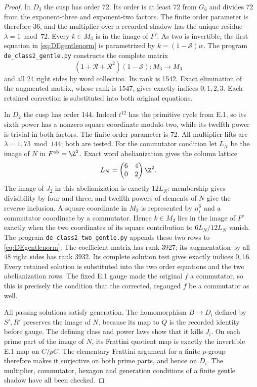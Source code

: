 \begin{proof}
In $D_3$ the cusp has order 72. Its order is at least 72 from $G_6$
and divides 72 from the exponent-three and exponent-two factors.
The finite order parameter is therefore 36, and the multiplier
over a recorded shadow has the unique residue $\lambda=1\bmod72$.
Every $k\in M_3$ is in the image of $F'$. As two is invertible,
the first equation in \eqref{eq:DEgentlenorm} is parametrized by
$k=(1-\mathcal S)w$. The program
\texttt{de\_class2\_gentle.py} constructs the complete matrix
\[
 (1+\mathcal R+\mathcal R^2)(1-\mathcal S):M_3\to M_3
\]
and all 24 right sides by word collection. Its rank is 1542.
Exact elimination of the augmented matrix, whose rank is 1547,
gives exactly indices $0,1,2,3$. Each retained correction is
substituted into both original equations.

In $D_2$ the cusp has order 144. Indeed $t^{12}$ has the primitive
cycle from E.1, so its sixth power has a nonzero square coordinate
modulo two, while its twelfth power is trivial in both factors.
The finite order parameter is 72. All multiplier lifts are
$\lambda=1,73\bmod144$; both are tested. For the commutator
condition let $L_N$ be the image of $N$ in $F^{\mathrm{ab}}=\Z^2$.
Exact word abelianization gives the column lattice
\[
 L_N=\begin{pmatrix}6&4\\0&2\end{pmatrix}\Z^2.
\]
The image of $J_2$ in this abelianization is exactly $12L_N$:
membership gives divisibility by four and three, and twelfth powers
of elements of $N$ give the reverse inclusion. A square coordinate
in $M_2$ is represented by $n_i^6$ and a commutator coordinate by
a commutator. Hence $k\in M_2$ lies in the image of $F'$ exactly
when the two coordinates of its square contribution to $6L_N/12L_N$
vanish. The program \texttt{de\_class2\_two\_gentle.py} appends
these two rows to \eqref{eq:DEgentlenorm}. The coefficient matrix
has rank 3927; its augmentation by all 48 right sides has rank 3932.
Its complete solution test gives exactly indices $0,16$.
Every retained solution is substituted into the two order equations
and the two abelianization rows. The fixed E.1 gauge made the
original $f$ a commutator, so this is precisely the condition that
the corrected, regauged $f$ be a commutator as well.

All passing solutions satisfy generation. The homomorphism
$B\to D_i$ defined by $S',R'$ preserves the image of $N$, because
its map to $Q$ is the recorded identity before gauge. The defining
class and power laws show that it kills $J_i$. On each prime part
of the image of $N$, its Frattini quotient map is exactly the
invertible E.1 map on $C/pC$. The elementary Frattini argument for
a finite $p$-group therefore makes it surjective on both prime
parts, and hence on $D_i$. The multiplier, commutator, hexagon and
generation conditions of a finite gentle shadow have all been
checked.


\end{proof}
